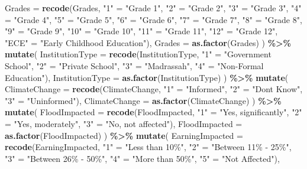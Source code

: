 \documentclass[
]{article}
\newenvironment{Shaded}{\begin{snugshade}}{\end{snugshade}}
\newcommand{\AttributeTok}[1]{\textcolor[rgb]{0.13,0.29,0.53}{#1}}
\newcommand{\FunctionTok}[1]{\textcolor[rgb]{0.13,0.29,0.53}{\textbf{#1}}}
\newcommand{\NormalTok}[1]{#1}
\newcommand{\OtherTok}[1]{\textcolor[rgb]{0.56,0.35,0.01}{#1}}
\newcommand{\SpecialCharTok}[1]{\textcolor[rgb]{0.81,0.36,0.00}{\textbf{#1}}}
\newcommand{\StringTok}[1]{\textcolor[rgb]{0.31,0.60,0.02}{#1}}
\begin{document}
\begin{Shaded}
\begin{Highlighting}[]
    \AttributeTok{Grades =} \FunctionTok{recode}\NormalTok{(Grades, }\StringTok{"1"} \OtherTok{=} \StringTok{"Grade 1"}\NormalTok{, }\StringTok{"2"} \OtherTok{=} \StringTok{"Grade 2"}\NormalTok{, }\StringTok{"3"} \OtherTok{=} \StringTok{"Grade 3"}\NormalTok{, }\StringTok{"4"} \OtherTok{=} \StringTok{"Grade 4"}\NormalTok{, }\StringTok{"5"} \OtherTok{=} \StringTok{"Grade 5"}\NormalTok{, }\StringTok{"6"} \OtherTok{=} \StringTok{"Grade 6"}\NormalTok{, }\StringTok{"7"} \OtherTok{=} \StringTok{"Grade 7"}\NormalTok{, }\StringTok{"8"} \OtherTok{=} \StringTok{"Grade 8"}\NormalTok{, }\StringTok{"9"} \OtherTok{=} \StringTok{"Grade 9"}\NormalTok{, }\StringTok{"10"} \OtherTok{=} \StringTok{"Grade 10"}\NormalTok{, }\StringTok{"11"} \OtherTok{=} \StringTok{"Grade 11"}\NormalTok{, }\StringTok{"12"} \OtherTok{=} \StringTok{"Grade 12"}\NormalTok{, }\StringTok{"ECE"} \OtherTok{=} \StringTok{"Early Childhood Education"}\NormalTok{),}
    \AttributeTok{Grades =} \FunctionTok{as.factor}\NormalTok{(Grades)}
\NormalTok{  ) }\SpecialCharTok{\%\textgreater{}\%}
  \FunctionTok{mutate}\NormalTok{(}
    \AttributeTok{InstitutionType =} \FunctionTok{recode}\NormalTok{(InstitutionType, }\StringTok{"1"} \OtherTok{=} \StringTok{"Government School"}\NormalTok{, }\StringTok{"2"} \OtherTok{=} \StringTok{"Private School"}\NormalTok{, }\StringTok{"3"} \OtherTok{=} \StringTok{"Madrassah"}\NormalTok{, }\StringTok{"4"} \OtherTok{=} \StringTok{"Non{-}Formal Education"}\NormalTok{),}
    \AttributeTok{InstitutionType =} \FunctionTok{as.factor}\NormalTok{(InstitutionType)}
\NormalTok{  ) }\SpecialCharTok{\%\textgreater{}\%}
  \FunctionTok{mutate}\NormalTok{(}
    \AttributeTok{ClimateChange =} \FunctionTok{recode}\NormalTok{(ClimateChange, }\StringTok{"1"} \OtherTok{=} \StringTok{"Informed"}\NormalTok{, }\StringTok{"2"} \OtherTok{=} \StringTok{"Don\textquotesingle{}t Know"}\NormalTok{, }\StringTok{"3"} \OtherTok{=} \StringTok{"Uninformed"}\NormalTok{),}
    \AttributeTok{ClimateChange =} \FunctionTok{as.factor}\NormalTok{(ClimateChange)}
\NormalTok{  ) }\SpecialCharTok{\%\textgreater{}\%}
  \FunctionTok{mutate}\NormalTok{(}
    \AttributeTok{FloodImpacted =} \FunctionTok{recode}\NormalTok{(FloodImpacted, }\StringTok{"1"} \OtherTok{=} \StringTok{"Yes, significantly"}\NormalTok{, }\StringTok{"2"} \OtherTok{=} \StringTok{"Yes, moderately"}\NormalTok{, }\StringTok{"3"} \OtherTok{=} \StringTok{"No, not affected"}\NormalTok{),}
    \AttributeTok{FloodImpacted =} \FunctionTok{as.factor}\NormalTok{(FloodImpacted)}
\NormalTok{  ) }\SpecialCharTok{\%\textgreater{}\%}
  \FunctionTok{mutate}\NormalTok{(}
    \AttributeTok{EarningImpacted =} \FunctionTok{recode}\NormalTok{(EarningImpacted, }\StringTok{"1"} \OtherTok{=} \StringTok{"Less than 10\%"}\NormalTok{, }\StringTok{"2"} \OtherTok{=} \StringTok{"Between 11\% {-} 25\%"}\NormalTok{, }\StringTok{"3"} \OtherTok{=} \StringTok{"Between 26\% {-} 50\%"}\NormalTok{, }\StringTok{"4"} \OtherTok{=} \StringTok{"More than 50\%"}\NormalTok{, }\StringTok{"5"} \OtherTok{=} \StringTok{"Not Affected"}\NormalTok{),}

\end{Highlighting}
\end{Shaded}
\end{document}
